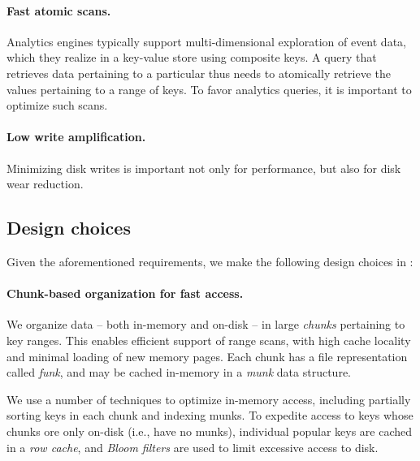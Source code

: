 \paragraph{Fast atomic scans.}
 Analytics engines typically support multi-dimensional exploration of event data, 
 which they realize in a key-value store using composite keys.   
A query that retrieves data pertaining to a particular {} thus needs to atomically 
retrieve the values pertaining to a range of keys. To favor analytics queries, it is important to optimize such scans. 
 
 \paragraph{Low write amplification.} 
 Minimizing disk writes is important not only for performance, but also for disk wear reduction.


\subsection{Design choices}

Given the aforementioned requirements, we make the following design choices in \sys:

\paragraph{Chunk-based organization for fast access.}
We organize data --  both in-memory and on-disk --  in large \emph{chunks}  pertaining to  key ranges.  
This enables efficient support of range scans, with  high cache locality and minimal loading of new memory pages. 
Each chunk has a file representation called  \emph{funk}, and may be cached in-memory in a  \emph{munk} data structure.

We use a number of techniques to optimize in-memory  access, including partially sorting keys in each chunk and 
indexing munks. 
To expedite access to  keys whose chunks ore only on-disk  (i.e., have no munks), 
individual popular keys are cached in a \emph{row cache}, 
and \emph{Bloom filters} are used to limit excessive access to disk. 


